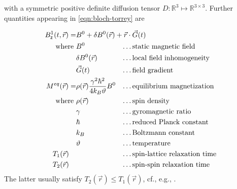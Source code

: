 \documentclass{ws-m3as}
\newcommand{\revision}[1]{{ #1}}
\newcommand{\Margin}[1]{}
\begin{document}
with a symmetric positive definite diffusion tensor $D:\mathbb{R}^3\mapsto \mathbb{R}^{3\times 3}$.
Further quantities appearing in \eqref{eqn:bloch-torrey} are
\Margin{R2 2)}
\begin{equation}\label{Meq-rho}
\begin{aligned}
B^1_{\mathsf{z}}(t, \vec r) =&B^0 + \delta B^0(\vec r) +   \vec r \cdot \vec G(t)\hspace*{-4cm}&& \\
\text{\revision{where }}&B^0 \quad&& \text{\ldots static magnetic field}\\
&\delta B^0(\vec r)\quad&& \text{\ldots local field inhomogeneity}\\
&\vec G(t)\quad&& \text{\ldots field gradient}\\
M^{eq}(\vec r)=& \rho(\vec r)\frac{\gamma^2 \hbar^2}{4k_B\vartheta}B^0  && \text{\ldots equilibrium magnetization}\\
\text{\revision{where }}&\rho(\vec r) \quad&& \text{\ldots spin density}\\
&\gamma  \quad&& \text{\ldots gyromagnetic ratio}\\
&\hbar  \quad&& \text{\ldots reduced Planck constant}\\
&k_B  \quad&& \text{\ldots Boltzmann constant}\\
&\vartheta  \quad&& \text{\ldots temperature}\\
T_1(\vec r)\quad& \quad &&\text{\ldots spin-lattice relaxation time } \\
T_2(\vec r)\quad& \quad &&\text{\ldots spin-spin relaxation time } 
\end{aligned}
\end{equation}
The latter usually satisfy $T_2(\vec r)\leq T_1(\vec r)$, %
cf., e.g., \cite[pages 10-11]{Uecker2009NonlinearRM}. 
\end{document}
